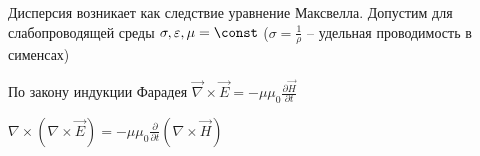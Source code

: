 \documentclass[12pt]{article}
\begin{document}


Дисперсия возникает как следствие уравнение Максвелла. Допустим для слабопроводящей среды $\sigma, \varepsilon, \mu = \const$ ($\sigma = \frac{1}{\rho}$ -- удельная проводимость в сименсах)

По закону индукции Фарадея $\vec\nabla \times \vec E = -\mu\mu_0 \frac{\partial \vec H}{\partial t}$

$\nabla \times (\nabla \times \vec E) = -\mu\mu_0 \frac{\partial}{\partial t} (\nabla \times \vec H)$
\end{document}
